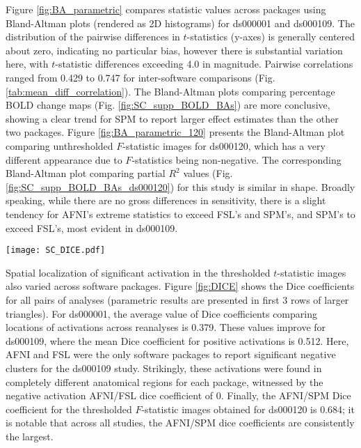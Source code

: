 Figure \ref{fig:BA_parametric} compares statistic values across packages using Bland-Altman plots (rendered as 2D histograms) for ds000001 and ds000109. The distribution of the pairwise differences in $t$-statistics (y-axes) is generally centered about zero, indicating no particular bias, however there is substantial variation here, with $t$-statistic differences exceeding 4.0 in magnitude. Pairwise correlations ranged from 0.429 to 0.747 for inter-software comparisons (Fig. \ref{tab:mean_diff_correlation}). The Bland-Altman plots comparing percentage BOLD change maps (Fig. \ref{fig:SC_supp_BOLD_BAs}) are more conclusive, showing a clear trend for SPM to report larger effect estimates than the other two packages. Figure \ref{fig:BA_parametric_120} presents the Bland-Altman plot comparing unthresholded $F$-statistic images for ds000120, which has a very different appearance due to $F$-statistics being non-negative. The corresponding Bland-Altman plot comparing partial $R^{2}$ values (Fig. \ref{fig:SC_supp_BOLD_BAs_ds000120}) for this study is similar in shape. Broadly speaking, while there are no gross differences in sensitivity, there is a slight tendency for AFNI's extreme statistics to exceed FSL's and SPM's, and SPM's to exceed FSL's, most evident in ds000109. 

\begin{sidewaysfigure}[htbp]
\centering
	\texttt{[image: SC\_DICE.pdf]}	
\caption{Cross-software Bland-Altman 2D histogram comparing the unthresholded main effect of time $F$-statistic maps computed in AFNI and SPM for reanalyses of the ds000120 study. The differences are generally centered about zero, with a trend of large $F$-statistics for AFNI. The funnel-like pattern is a consequence of the $F$-statistic taking on only positive values.}
\label{fig:DICE}
\end{sidewaysfigure}

Spatial localization of significant activation in the thresholded $t$-statistic images also varied across software packages. Figure \ref{fig:DICE} shows the Dice coefficients for all pairs of analyses (parametric results are presented in first 3 rows of larger triangles). For ds000001, the average value of Dice coefficients comparing locations of activations across reanalyses is 0.379. These values improve for ds000109, where the mean Dice coefficient for positive activations is 0.512. Here, AFNI and FSL were the only software packages to report significant negative clusters for the ds000109 study. Strikingly, these activations were found in completely different anatomical regions for each package, witnessed by the negative activation AFNI/FSL dice coefficient of 0. Finally, the AFNI/SPM Dice coefficient for the thresholded $F$-statistic images obtained for ds000120 is 0.684; it is notable that across all studies, the AFNI/SPM dice coefficients are consistently the largest.

